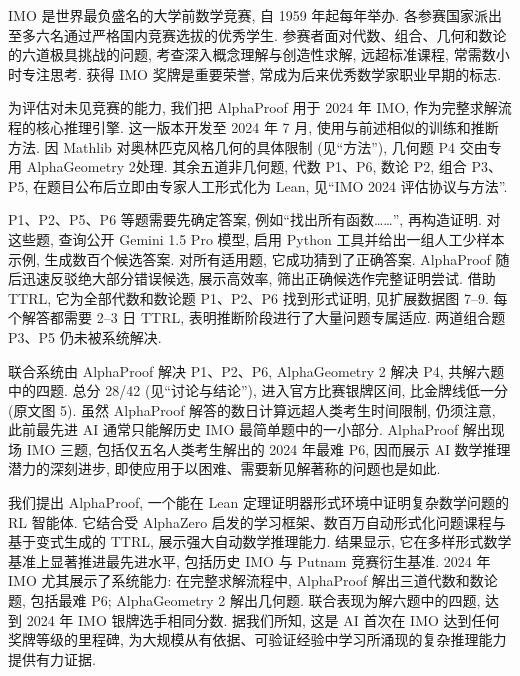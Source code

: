 

\label{alphaproof-imo}
IMO 是世界最负盛名的大学前数学竞赛, 自 1959 年起每年举办. 各参赛国家派出至多六名通过严格国内竞赛选拔的优秀学生. 参赛者面对代数、组合、几何和数论的六道极具挑战的问题, 考查深入概念理解与创造性求解, 远超标准课程, 常需数小时专注思考. 获得 IMO 奖牌是重要荣誉, 常成为后来优秀数学家职业早期的标志.

为评估对未见竞赛的能力, 我们把 AlphaProof 用于 2024 年 IMO, 作为完整求解流程的核心推理引擎. 这一版本开发至 2024 年 7 月, 使用与前述相似的训练和推断方法. 因 Mathlib 对奥林匹克风格几何的具体限制 (见“方法”), 几何题 P4 交由专用 AlphaGeometry 2\cite{alphaproof-ref3}处理. 其余五道非几何题, 代数 P1、P6, 数论 P2, 组合 P3、P5, 在题目公布后立即由专家人工形式化为 Lean, 见“IMO 2024 评估协议与方法”.

P1、P2、P5、P6 等题需要先确定答案, 例如“找出所有函数……”, 再构造证明. 对这些题, 查询公开 Gemini 1.5 Pro 模型\cite{alphaproof-ref22}, 启用 Python 工具并给出一组人工少样本示例, 生成数百个候选答案. 对所有适用题, 它成功猜到了正确答案. AlphaProof 随后迅速反驳绝大部分错误候选, 展示高效率, 筛出正确候选作完整证明尝试. 借助 TTRL, 它为全部代数和数论题 P1、P2、P6 找到形式证明, 见扩展数据图 7--9. 每个解答都需要 2--3 日 TTRL, 表明推断阶段进行了大量问题专属适应. 两道组合题 P3、P5 仍未被系统解决.

联合系统由 AlphaProof 解决 P1、P2、P6, AlphaGeometry 2 解决 P4, 共解六题中的四题. 总分 28/42 (见“讨论与结论”), 进入官方比赛银牌区间, 比金牌线低一分 (原文图 5). 虽然 AlphaProof 解答的数日计算远超人类考生时间限制, 仍须注意, 此前最先进 AI 通常只能解历史 IMO 最简单题中的一小部分\cite{alphaproof-ref13,alphaproof-ref17,alphaproof-ref23}. AlphaProof 解出现场 IMO 三题, 包括仅五名人类考生解出的 2024 年最难 P6, 因而展示 AI 数学推理潜力的深刻进步, 即使应用于以困难、需要新见解著称的问题也是如此.



\label{alphaproof-discussion}
我们提出 AlphaProof, 一个能在 Lean 定理证明器形式环境中证明复杂数学问题的 RL 智能体. 它结合受 AlphaZero 启发的学习框架、数百万自动形式化问题课程与基于变式生成的 TTRL, 展示强大自动数学推理能力. 结果显示, 它在多样形式数学基准上显著推进最先进水平, 包括历史 IMO 与 Putnam 竞赛衍生基准. 2024 年 IMO 尤其展示了系统能力: 在完整求解流程中, AlphaProof 解出三道代数和数论题, 包括最难 P6; AlphaGeometry 2 解出几何题. 联合表现为解六题中的四题, 达到 2024 年 IMO 银牌选手相同分数. 据我们所知, 这是 AI 首次在 IMO 达到任何奖牌等级的里程碑, 为大规模从有依据、可验证经验中学习所涌现的复杂推理能力提供有力证据.

